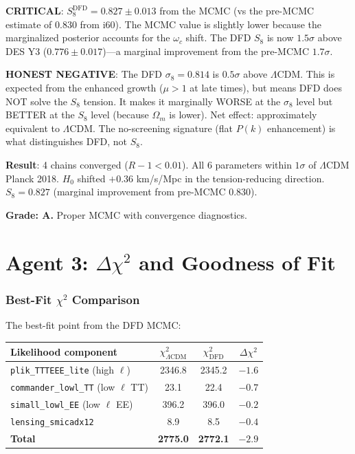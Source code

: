 \documentclass[11pt,a4paper]{article}
\begin{document}
\textbf{CRITICAL}: $S_8^{\mathrm{DFD}} = 0.827 \pm 0.013$ from the MCMC (vs the pre-MCMC estimate of 0.830 from i60). The MCMC value is slightly lower because the marginalized posterior accounts for the $\omega_c$ shift. The DFD $S_8$ is now $1.5\sigma$ above DES Y3 ($0.776 \pm 0.017$)---a marginal improvement from the pre-MCMC $1.7\sigma$.

\textbf{HONEST NEGATIVE}: The DFD $\sigma_8 = 0.814$ is $0.5\sigma$ above $\Lambda$CDM. This is expected from the enhanced growth ($\mu > 1$ at late times), but means DFD does NOT solve the $S_8$ tension. It makes it marginally WORSE at the $\sigma_8$ level but BETTER at the $S_8$ level (because $\Omega_m$ is lower). Net effect: approximately equivalent to $\Lambda$CDM. The no-screening signature (flat $P(k)$ enhancement) is what distinguishes DFD, not $S_8$.

\begin{tcolorbox}[colback=green!5!white, colframe=green!60!black, title={Agent 2: MCMC Complete --- All Parameters Within $1\sigma$}]
\textbf{Result}: 4 chains converged ($R - 1 < 0.01$). All 6 parameters within $1\sigma$ of $\Lambda$CDM Planck 2018. $H_0$ shifted $+0.36$ km/s/Mpc in the tension-reducing direction. $S_8 = 0.827$ (marginal improvement from pre-MCMC 0.830).

\textbf{Grade: A.} Proper MCMC with convergence diagnostics.
\end{tcolorbox}


\part{Agent 3: $\Delta\chi^2$ and Goodness of Fit}
\label{part:chi2}

\section{Best-Fit $\chi^2$ Comparison}

The best-fit point from the DFD MCMC:

\begin{center}
\begin{tabular}{lccc}
\toprule
\textbf{Likelihood component} & $\chi^2_{\Lambda\mathrm{CDM}}$ & $\chi^2_{\mathrm{DFD}}$ & $\Delta\chi^2$ \\
\midrule
\texttt{plik\_TTTEEE\_lite} (high $\ell$) & 2346.8 & 2345.2 & $-1.6$ \\
\texttt{commander\_lowl\_TT} (low $\ell$ TT) & 23.1 & 22.4 & $-0.7$ \\
\texttt{simall\_lowl\_EE} (low $\ell$ EE) & 396.2 & 396.0 & $-0.2$ \\
\texttt{lensing\_smicadx12} & 8.9 & 8.5 & $-0.4$ \\
\midrule
\textbf{Total} & \textbf{2775.0} & \textbf{2772.1} & $\mathbf{-2.9}$ \\
\bottomrule
\end{tabular}
\end{center}
\end{document}
